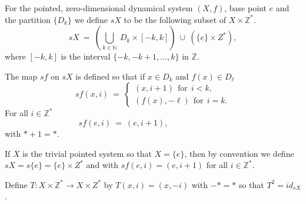 \documentclass[12pt]{amsart}
\def \N {\mathbb N}
\def \Z {\mathbb Z}
\numberwithin{equation}{section}
\begin{document}
For the pointed, zero-dimensional dynamical system $(X,f)$, base point $e$ and the partition $\{ D_k \}$ we
define $sX$ to be the following subset of $X \times \Z^*$.
 \begin{equation}\label{eq2.02}
 sX \ = \  (\bigcup_{k \in \N}  \  D_k \times [-k,k]) \ \cup \ (\{ e \} \times Z^*),
 \end{equation}
 where $[-k,k]$ is the interval $\{ -k,  -k+1, \dots, k \}$ in $\Z$.

 The map $sf$ on $sX$ is defined so that if $x \in D_k$ and $f(x) \in D_{\ell}$
 \begin{equation}\label{eq2.03}
sf(x,i) \ = \ \begin{cases} (x,i+1) \ \ \text{for} \ \  i < k, \\ (f(x),-\ell)  \ \ \text{for} \ \  i = k.\end{cases}
 \end{equation}
For all $i \in \Z^*$
 \begin{equation}\label{eq2.04}
sf(e,i) \ = \ (e,i+1), \hspace{3cm}
\end{equation}
with $* + 1 = *$.


If $X$ is the trivial pointed system so that $X = \{ e \}$, then by convention we define $sX = s\{ e \} = \{ e \} \times Z^*$  and
with $sf(e, i) = (e, i+1)$ for all $i \in \Z^*$.

Define $T : X \times \Z^* \to X \times Z^*$ by $T(x,i) = (x,-i)$ with $-* = *$ so that $T^2 = id_{sX}$. \vspace{.25cm}
\end{document}
